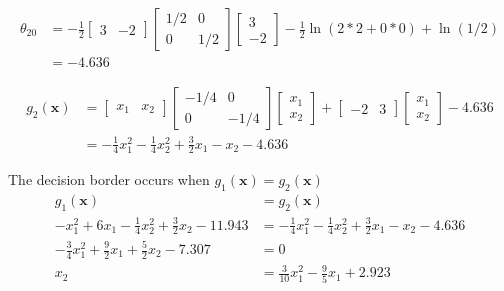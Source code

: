 \documentclass{homeworg}
\begin{document}
\begin{equation}
    \begin{aligned}
        {\theta}_{20} &=
        -\frac{1}{2}
        \begin{bmatrix}
            3 & -2
        \end{bmatrix}
        \begin{bmatrix}
            1/2 & 0 \\ 0 & 1/2
        \end{bmatrix}
        \begin{bmatrix}
            3 \\ -2
        \end{bmatrix}
        -\frac{1}{2}\ln(2*2+0*0)+\ln(1/2)
        \\ &= -4.636
    \end{aligned}
\end{equation}

\begin{equation}
    \begin{aligned}
        g_2(\bm{x}) &=
        \begin{bmatrix}
            x_1 & x_2
        \end{bmatrix}
        \begin{bmatrix}
            -1/4 & 0 \\
            0 & -1/4
        \end{bmatrix}
        \begin{bmatrix}
            x_1 \\ x_2
        \end{bmatrix} + 
        \begin{bmatrix}
            -2 & 3
        \end{bmatrix}
        \begin{bmatrix}
            x_1 \\ x_2
        \end{bmatrix} -4.636
        \\ &=
        -\frac{1}{4}x_1^2-\frac{1}{4}x_2^2+\frac{3}{2}x_1-x_2-4.636
    \end{aligned}
\end{equation}

The decision border occurs when $g_1(\bm{x}) = g_2(\bm{x})$
\begin{equation}
    \begin{aligned}
        g_1(\bm{x}) &= g_2(\bm{x}) \\
        -x_1^2+6x_1-\frac{1}{4}x_2^2+\frac{3}{2}x_2-11.943 &= -\frac{1}{4}x_1^2-\frac{1}{4}x_2^2+\frac{3}{2}x_1-x_2-4.636
        \\
        -\frac{3}{4}x_1^2
        +\frac{9}{2}x_1
        +\frac{5}{2}x_2
        -7.307
        &= 0 \\
        x_2
        &=\frac{3}{10}x_1^2-\frac{9}{5}x_1+2.923
    \end{aligned}
\end{equation}
\end{document}
